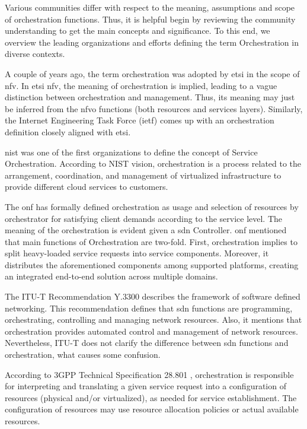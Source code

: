 Various communities differ with respect to the meaning, assumptions and scope of orchestration functions. Thus, it is helpful begin by reviewing the community understanding to get the main concepts and significance. To this end, we overview the leading organizations and efforts defining the term Orchestration in diverse contexts.

A couple of years ago, the term orchestration was adopted by \gls{etsi} in the scope of \gls{nfv}. In \gls{etsi} \gls{nfv}, the meaning of orchestration is implied, leading to a vague distinction between orchestration and management. Thus, its meaning may just be inferred from the \gls{nfvo} functions (both resources and services layers). Similarly, the Internet Engineering Task Force (\gls{ietf}) comes up with an orchestration definition closely aligned with \gls{etsi}. 

\gls{nist} \cite{Bohn2011NISTArchitecture} was one of the first organizations to define the concept of Service Orchestration. According to NIST vision, orchestration is a process related to the arrangement, coordination, and management of virtualized infrastructure to provide different cloud services to customers.

The \gls{onf} \cite{OpenNetworkingFoundation2016FrameworkNetworks} has formally defined orchestration as usage and selection of resources by orchestrator for satisfying client demands according to the service level. The meaning of the orchestration is evident given a \gls{sdn} Controller. \gls{onf} mentioned that main functions of Orchestration are two-fold. First, orchestration implies to split heavy-loaded service requests into service components. Moreover, it distributes the aforementioned components among supported platforms, creating an integrated end-to-end solution across multiple domains.

The ITU-T Recommendation Y.3300 \cite{InternationalTelecommunicationUnion2014ITU-TNetworking} describes the framework of software defined networking. This recommendation defines that \gls{sdn} functions are programming, orchestrating, controlling and managing network resources. Also, it mentions that orchestration provides automated control and management of network resources. Nevertheless, ITU-T does not clarify the difference between \gls{sdn} functions and orchestration, what causes some confusion.

According to 3GPP Technical Specification 28.801 \cite{3GPP2017TRNetwork}, orchestration is responsible for interpreting and translating a given service request into a configuration of resources (physical and/or virtualized), as needed for service establishment. The configuration of resources may use resource allocation policies or actual available resources. 

